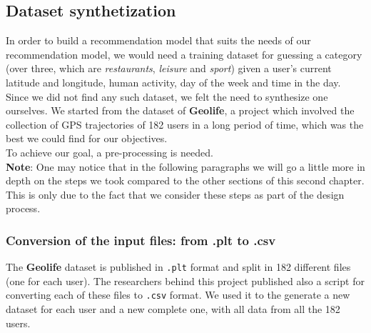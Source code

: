\documentclass[../../main]{subfiles}
\begin{document}
\subsection{Dataset synthetization}
\label{ss:dataset-synthetization}

In order to build a recommendation model that suits the needs of our recommendation model, we would need a training dataset for guessing a category 
(over three, which are \textit{restaurants}, \textit{leisure} and \textit{sport}) given a user's current latitude and longitude, human activity, day of the week and time in the day.
Since we did not find any such dataset, we felt the need to synthesize one ourselves.
We started from the dataset of \textbf{Geolife}, a project which involved the collection of GPS trajectories of 182 users in a long period of time, which was the best we could find for our objectives.\\
To achieve our goal, a pre-processing is needed.\\
\textbf{Note}: One may notice that in the following paragraphs we will go a little more in depth on the steps we took compared to the other sections of this second chapter.
This is only due to the fact that we consider these steps as part of the design process.

\subsubsection{Conversion of the input files: from .plt to .csv}
\label{sss:conversion-input-files}
The \textbf{Geolife} dataset is published in \texttt{.plt} format and split in 182 different files (one for each user).
The researchers behind this project published also a script for converting each of these files to \texttt{.csv} format.
We used it to the generate a new dataset for each user and a new complete one, with all data from all the 182 users.
\end{document}
